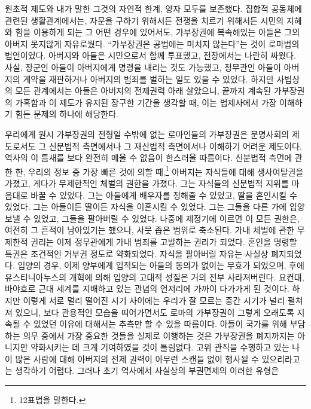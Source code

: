 원초적 제도와 내가 말한 그것의 자연적 한계, 양자 모두를 보존했다.
집합적 공동체에 관련된 생활관계에서는,
자문을 구하기 위해서든 전쟁을 치르기 위해서든
시민의 지혜와 힘을 이용하게 되는 그 어떤 경우에 있어서도,
가부장권에 복속해있는 아들은 그의 아버지 못지않게
자유로웠다.
``가부장권은 공법에는 미치지
않는다''는 것이 로마법의 법언이었다.
아버지와 아들은 시민으로서 함께 투표했고, 전장에서는 나란히 싸웠다.
사실, 장군인 아들이 아버지에게 명령을 내리는 것도 가능했고,
정무관인 아들이 아버지의 계약을 재판하거나
아버지의 범죄를 벌하는 일도 있을 수 있었다.
하지만 사법상의 모든 관계에서는
아들은 아버지의 전제권력 아래 살았으니,
끝까지 계속된 가부장권의 가혹함과
이 제도가 유지된 장구한 기간을 생각할 때,
이는 법제사에서 가장 이해하기 힘든 문제의 하나에 해당한다.

우리에게 원시 가부장권의 전형일 수밖에 없는
로마인들의 가부장권은
문명사회의 제도로서도
그 신분법적 측면에서나 그 재산법적 측면에서나
이해하기 어려운 제도이다.
역사의 이 틈새를 보다 완전히 메울 수 없음이 한스러울 따름이다.
신분법적 측면에 관한 한,
우리의 정보 중 가장 빠른 것에 의할 때,\footnote{12표법을 말한다.}
아버지는 자식들에 대해 생사여탈권을 가졌고,
게다가 무제한적인 체벌의 권한을 가졌다.
그는 자식들의 신분법적 지위를 마음대로 바꿀 수 있었다.
그는 아들에게 배우자를 정해줄 수 있었고, 딸을 혼인시킬 수 있었다.
그는 아들이든 딸이든 자식을 이혼시킬 수 있었다.
그는 그들을 다른 가에 입양보낼 수 있었고, 그들을 팔아버릴 수 있었다.
나중에 제정기에 이르면 이 모든 권한은, 여전히 그 흔적이 남아있기는 했으나,
사뭇 좁은 범위로 축소된다.
가내 체벌에 관한 무제한적 권리는 이제
정무관에게 가내 범죄를 고발하는 권리가 되었다.
혼인을 명령할 특권은 조건적인 거부권 정도로 약화되었다.
자식을 팔아버릴 자유는 사실상 폐지되었다.
입양의 경우, 이제 양부에게 입적되는 아들의 동의가 없이는
무효가 되었으며, 후에 유스티니아누스의 개혁에 의해
입양의 고대적 성질은 거의 전부 사라져버린다.
요컨대, 바야흐로 근대 세계를 지배하고 있는 관념의 언저리에
가까이 다가가게 된 것이다.
하지만 이렇게 서로 멀리 떨어진 시기 사이에는 우리가 잘 모르는
중간 시기가 널리 펼쳐져 있으니,
보다 관용적인 모습을 띠어가면서도
로마의 가부장권이
그렇게 오래도록 지속될 수 있었던
이유에 대해서는 추측만 할 수 있을 따름이다.
아들이 국가를 위해 부담하는 의무 중에서 가장 중요한 것들을
실제로 이행하는 것은 가부장권을 폐지까지는 아니지만 약화시키는 데
크게 기여하였을 것이 틀림없다.
고위 관직을 수행하고 있는 나이 많은 사람에 대해
아버지의 전제 권력이 아무런 스캔들 없이 행사될 수 있으리라고는
생각하기 어렵다.
그러나
초기 역사에서
사실상의 부권면제의 이러한 유형은
